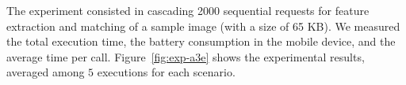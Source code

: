 The experiment consisted in cascading 2000 sequential requests for feature extraction and matching of a sample image (with a size of 65 KB). We measured the total execution time, the battery consumption in the mobile device, and the average time per call. Figure~\ref{fig:exp-a3e} shows the experimental results, averaged among $5$ executions for each scenario.

